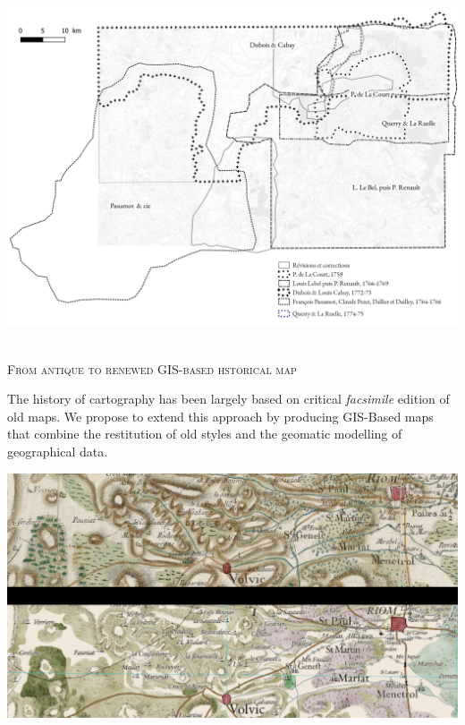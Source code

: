 \documentclass[portrait, A0]{sciposter}
\begin{document}
\begin{minipage}[b]{75cm}
\begin{multicols}{3}
\begin{center}
 \label{map:contours}
 \includegraphics[width=21cm]{gfx/Contours.png}
 \end{center}

~\\
\normalsize
\textsc{From antique to renewed GIS-based hstorical map}


The history of cartography has been largely based on critical \emph{facsimile} edition of old maps. We propose to extend this approach by producing GIS-Based maps that combine the restitution of old styles and the geomatic modelling of geographical data.

\vfill

\begin{center}
 \includegraphics[width=21cm]{gfx/Fantome52extraits}
 \end{center}

\end{multicols}
\end{minipage}
\end{document}
